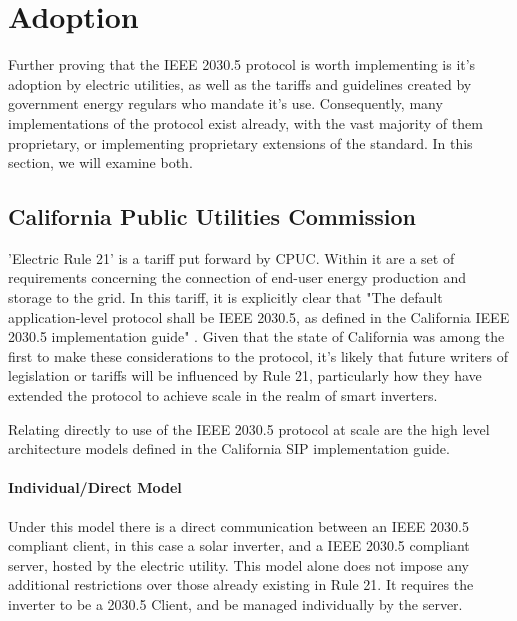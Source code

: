 \chapter{Adoption}\label{ch:adoption}

Further proving that the IEEE 2030.5 protocol is worth implementing is it's adoption by electric utilities, as well as the tariffs and guidelines created by government energy regulars who mandate it's use.
Consequently, many implementations of the protocol exist already, with the vast majority of them proprietary, or implementing proprietary extensions of the standard.
In this section, we will examine both.

\section{California Public Utilities Commission}
'Electric Rule 21' is a tariff put forward by CPUC. Within it are a set of requirements concerning the connection of end-user energy production and storage to the grid. In this tariff, it is explicitly clear that
"The default application-level protocol shall be IEEE 2030.5, as defined in the California IEEE 2030.5 implementation guide" \cite[]{Rule21}.
Given that the state of California was among the first to make these considerations to the protocol, it's likely that future writers of legislation or tariffs will be influenced by Rule 21, particularly how they have extended the protocol to achieve scale in the realm of smart inverters.

Relating directly to use of the IEEE 2030.5 protocol at scale are the high level architecture models defined in the California SIP implementation guide.

\subsubsection{Individual/Direct Model}
Under this model there is a direct communication between an IEEE 2030.5 compliant client, in this case a solar inverter, and a IEEE 2030.5 compliant server, hosted by the electric utility.
This model alone does not impose any additional restrictions over those already existing in Rule 21. It requires the inverter to be a 2030.5 Client, and be managed individually by the server.

